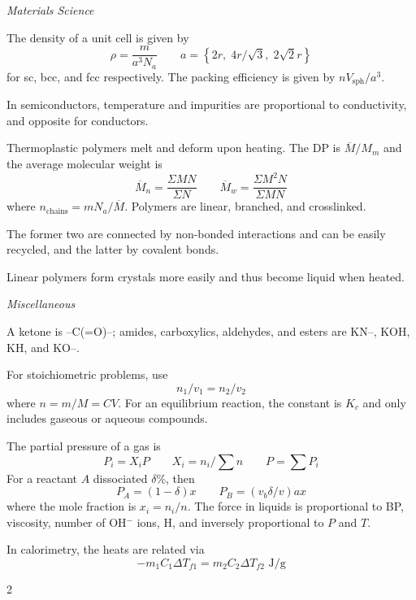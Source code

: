 \documentclass[10pt]{extarticle}
\begin{document}
\begin{multicols*}{2}

\bigskip
{\Large\textit{Materials Science}}
\bigskip

The density of a unit cell is given by
\begin{equation}
  \rho = \frac{m}{a^3 N_a} \qquad a = \left\{ 2r, \; 4r/\sqrt 3, \; 2 \sqrt 2 r  \right\}
\end{equation}
for sc, bcc, and fcc respectively. The packing efficiency is given by $n V_{\text{sph}} / a^3$.

\bigskip
In semiconductors, temperature and impurities are proportional to conductivity, and opposite for conductors.

\bigskip
Thermoplastic polymers melt and deform upon heating. The DP is $\overline M / M_{m}$ and the average molecular weight is
\begin{equation}
  \overline M_n = \frac{\Sigma MN}{\Sigma N} \qquad \overline M_w = \frac{\Sigma M^2 N}{\Sigma MN}
\end{equation}
where $n_\text{chains} = m N_a / \overline M$. Polymers are linear, branched, and crosslinked.

\bigskip
The former two are connected by non-bonded interactions and can be easily recycled, and the latter by covalent bonds.

\bigskip
Linear polymers form crystals more easily and thus become liquid when heated.


\vspace{7mm}
{\Large\textit{Miscellaneous}}
\bigskip

A ketone is --C(=O)--; amides, carboxylics, aldehydes, and esters are KN--, KOH, KH, and KO--.

\bigskip
For stoichiometric problems, use
\begin{equation}
  n_1/v_1 = n_2/v_2
\end{equation}
where $n = m/M = CV$. For an equilibrium reaction, the constant is $K_c$ and only includes gaseous or aqueous compounds.

\bigskip
The partial pressure of a gas is
\begin{equation}
  P_i = X_i P \qquad X_i = n_i / \textstyle\sum n \qquad P = \textstyle\sum P_i
\end{equation}
For a reactant $A$ dissociated $\delta \%$, then \begin{equation}
  P_A = (1-\delta)x \qquad P_B = (v_b \delta / v)a x
\end{equation}
where the mole fraction is $x_i = n_i / n$. The force in liquids is proportional to BP, viscosity, number of OH$^-$ ions, H, and inversely proportional to $P$ and $T$.

\bigskip
In calorimetry, the heats are related via \begin{equation}
  -m_1 C_1 \Delta T_{f1} = m_2 C_2 \Delta T_{f2} \text{ J/g}
\end{equation}

\end{multicols*}{2}
\end{document}
